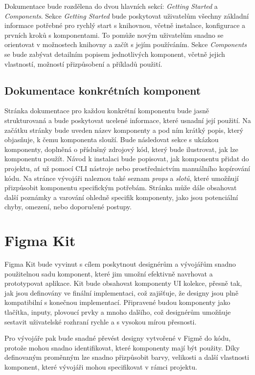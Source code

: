Dokumentace bude rozdělena do dvou hlavních sekcí: \emph{Getting Started} a \emph{Components}. Sekce \emph{Getting Started} bude poskytovat uživatelům všechny základní informace potřebné pro rychlý start s knihovnou, včetně instalace, konfigurace a prvních kroků s komponentami. To pomůže novým uživatelům snadno se orientovat v možnostech knihovny a začít s jejím používáním. Sekce \emph{Components} se bude zabývat detailním popisem jednotlivých komponent, včetně jejich vlastností, možností přizpůsobení a příkladů použití.

\subsection{Dokumentace konkrétních komponent}
Stránka dokumentace pro každou konkrétní komponentu bude jasně strukturovaná a bude poskytovat ucelené informace, které usnadní její použití. Na začátku stránky bude uveden název komponenty a pod ním krátký popis, který objasňuje, k čemu komponenta slouží. Bude následovat sekce s ukázkou komponenty, doplněná o příslušný zdrojový kód, který bude ilustrovat, jak lze komponentu použít. Návod k instalaci bude popisovat, jak komponentu přidat do projektu, ať už pomocí CLI nástroje nebo prostřednictvím manuálního kopírování kódu. Na stránce vývojáři naleznou také seznam \emph{props} a \emph{slotů}, které umožňují přizpůsobit komponentu specifickým potřebám. Stránka může dále obsahovat další poznámky a varování ohledně specifik komponenty, jako jsou potenciální chyby, omezení, nebo doporučené postupy.

\section{Figma Kit}
Figma Kit bude vyvinut s cílem poskytnout designérům a vývojářům snadno použitelnou sadu komponent, které jim umožní efektivně navrhovat a prototypovat aplikace. Kit bude obsahovat komponenty UI kolekce, přesně tak, jak jsou definovány ve finální implementaci, což zajišťuje, že designy jsou plně kompatibilní s konečnou implementací. Připravené budou komponenty jako tlačítka, inputy, plovoucí prvky a mnoho dalšího, což designérům umožňuje sestavit uživatelské rozhraní rychle a s vysokou mírou přesnosti.

Pro vývojáře pak bude snadné převést designy vytvořené v Figmě do kódu, protože mohou snadno identifikovat, které komponenty mají být použity. Díky definovaným proměnným lze snadno přizpůsobit barvy, velikosti a další vlastnosti komponent, které vývojáři mohou specifikovat v rámci projektu.

